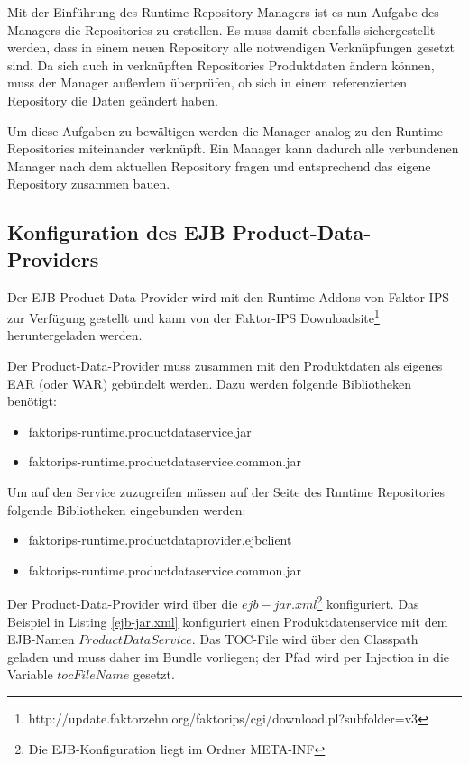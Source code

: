 \documentclass[headsepline=true, footsepline=true]{scrartcl}
\begin{document}
Mit der Einführung des Runtime Repository Managers ist es nun Aufgabe des
Managers die Repositories zu erstellen. Es muss damit ebenfalls sichergestellt
werden, dass in einem neuen Repository alle notwendigen Verknüpfungen gesetzt
sind. Da sich auch in verknüpften Repositories Produktdaten ändern können, muss
der Manager außerdem überprüfen, ob sich in einem referenzierten Repository die
Daten geändert haben.

Um diese Aufgaben zu bewältigen werden die Manager analog zu den Runtime
Repositories miteinander verknüpft. Ein Manager kann dadurch alle verbundenen
Manager nach dem aktuellen Repository fragen und entsprechend das eigene
Repository zusammen bauen.

\subsection{Konfiguration des EJB Product-Data-Providers}

Der EJB Product-Data-Provider wird mit den Runtime-Addons von Faktor-IPS zur Verfügung gestellt und
kann von der Faktor-IPS Downloadsite\footnote{http://update.faktorzehn.org/faktorips/cgi/download.pl?subfolder=v3} heruntergeladen werden.

Der Product-Data-Provider muss zusammen mit den Produktdaten als eigenes EAR (oder WAR) gebündelt werden.
Dazu werden folgende Bibliotheken benötigt:
\begin{itemize}
	\item faktorips-runtime.productdataservice.jar
	\item faktorips-runtime.productdataservice.common.jar
\end{itemize}

Um auf den Service zuzugreifen müssen auf der Seite des Runtime Repositories
folgende Bibliotheken eingebunden werden:

\begin{itemize}
	\item faktorips-runtime.productdataprovider.ejbclient
	\item faktorips-runtime.productdataservice.common.jar
\end{itemize}

Der Product-Data-Provider wird über die $ejb-jar.xml$\footnote{Die EJB-Konfiguration liegt im Ordner META-INF} konfiguriert. Das Beispiel in Listing \ref{ejb-jar.xml}
konfiguriert einen Produktdatenservice mit dem EJB-Namen $ProductDataService$. Das TOC-File wird über den Classpath geladen und muss daher im Bundle
vorliegen; der Pfad wird per Injection in die Variable $tocFileName$ gesetzt.
\end{document}
